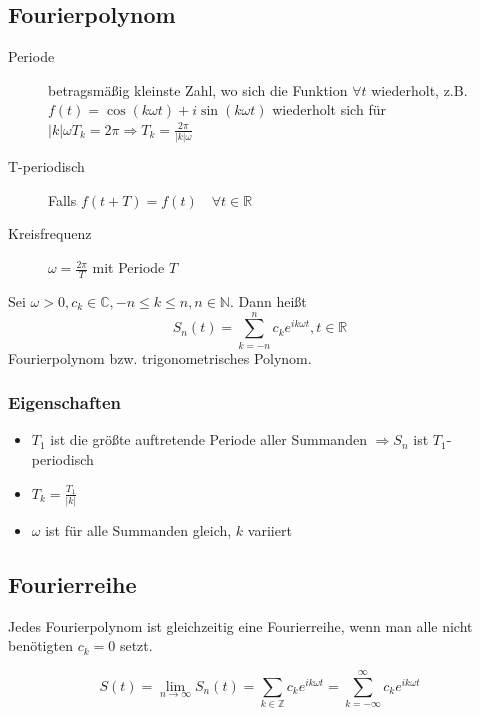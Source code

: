 \begin{sectionbox}
    \subsection{Fourierpolynom}
    \begin{description}
        \item[Periode] betragsmäßig kleinste Zahl, wo sich die Funktion $\forall t$ wiederholt,
              z.B. $f(t)=\cos(k\omega t) + i\sin(k\omega t)$ wiederholt sich für $|k|\omega T_k=2\pi \Rightarrow T_k=\frac{2\pi}{|k|\omega}$
        \item[T-periodisch] Falls $f(t + T)=f(t) \quad \forall t\in\mathbb R$
        \item[Kreisfrequenz] $\omega = \frac{2\pi}{T}$ mit Periode $T$
    \end{description}

    Sei $\omega > 0, c_k \in \mathbb C, -n \le k \le n, n \in \mathbb N$. Dann heißt
    \begin{equation*}
        S_n(t)=\sum_{k=-n}^{n}c_ke^{ik\omega t}, t\in\mathbb R
    \end{equation*}
    Fourierpolynom bzw. trigonometrisches Polynom.

    \subsubsection{Eigenschaften}
    \begin{itemize}
        \item $T_1$ ist die größte auftretende Periode aller Summanden $\Rightarrow S_n$ ist $T_1$-periodisch
        \item $T_k= \frac{T_1}{|k|}$
        \item $\omega$ ist für alle Summanden gleich, $k$ variiert
    \end{itemize}
\end{sectionbox}

\subsection{Fourierreihe}
Jedes Fourierpolynom ist gleichzeitig eine Fourierreihe, wenn man alle nicht benötigten $c_k=0$ setzt.
\begin{emphbox}
    \begin{equation*}
        S(t)=\lim_{n\rightarrow\infty}S_n(t)=\sum_{k\in\mathbb Z}c_ke^{ik\omega t}=\sum_{k=-\infty}^{\infty}c_ke^{ik\omega t}
    \end{equation*}
\end{emphbox}


